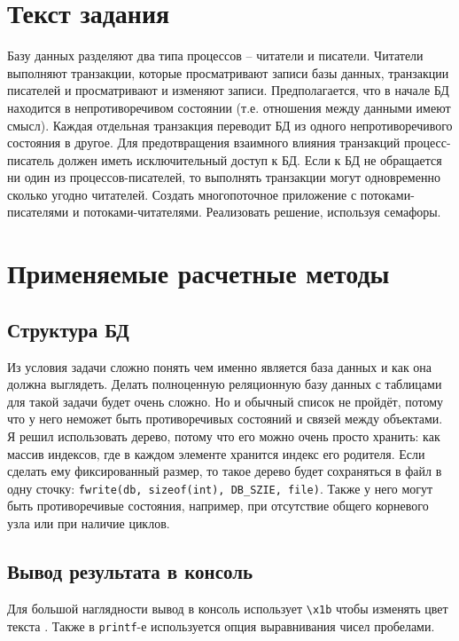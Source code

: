 \documentclass[a4paper]{article}
\begin{document}
  \newpage
  \tableofcontents
  \newpage

  \section{Текст задания}
  Базу данных разделяют два типа процессов -- читатели и писатели.
  Читатели выполняют транзакции, которые просматривают записи базы данных, транзакции писателей и просматривают и изменяют записи.
  Предполагается, что в начале БД находится в непротиворечивом состоянии (т.е. отношения между данными имеют смысл).
  Каждая отдельная транзакция переводит БД из одного непротиворечивого состояния в другое.
  Для предотвращения взаимного влияния транзакций процесс-писатель должен иметь исключительный доступ к БД.
  Если к БД не обращается ни один из процессов-писателей, то выполнять транзакции могут одновременно сколько угодно читателей.
  Создать многопоточное приложение с потоками-писателями и потоками-читателями.
  Реализовать решение, используя семафоры. \cite{task}

  \newpage
  \section{Применяемые расчетные методы}
  \subsection{Структура БД}
  Из условия задачи сложно понять чем именно является база данных и как она должна выглядеть.
  Делать полноценную реляционную базу данных с таблицами для такой задачи будет очень сложно.
  Но и обычный список не пройдёт, потому что у него неможет быть противоречивых состояний и связей между объектами.
  Я решил использовать дерево, потому что его можно очень просто хранить:
  как массив индексов, где в каждом элементе хранится индекс его родителя.
  Если сделать ему фиксированный размер, то такое дерево будет сохраняться в файл в одну сточку:
  \texttt{fwrite(db, sizeof(int), DB\_SZIE, file)}.
  Также у него могут быть противоречивые состояния, например, при отсутствие общего корневого узла или при наличие циклов.

  \subsection{Вывод результата в консоль}
  Для большой наглядности вывод в консоль использует \texttt{\textbackslash{}x1b} чтобы изменять цвет текста \cite{ansi}.
  Также в \texttt{printf}-е используется опция выравнивания чисел пробелами.
\end{document}
